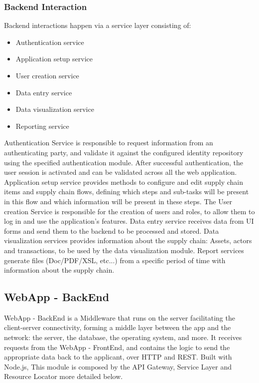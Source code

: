 \subsubsection{Backend Interaction}\label{sec:BackendInteraction}
Backend interactions happen via a service layer consisting of:

\begin{itemize}
\item Authentication service
\item Application setup service
\item User creation service
\item Data entry service
\item Data visualization service
\item Reporting service
\end{itemize}

Authentication Service is responsible to request information from an authenticating party, and validate it against the configured identity repository using the specified authentication module. After successful authentication, the user session is activated and can be validated across all the web application. Application setup service provides methods to configure and edit  supply chain items and supply chain flows, defining which steps and sub-tasks will be present in this flow and which information will be present in these steps. The User creation Service is responsible for the creation of users and roles, to allow them to log in and use the application’s features. Data entry service receives data from UI forms and send them to the backend to be processed and stored. Data visualization services provides information about the supply chain: Assets, actors and transactions, to be used by the data visualization module. Report services generate files (Doc/PDF/XSL, etc...) from a specific period of time with information about the supply chain.

\subsection{WebApp - BackEnd}\label{sec:WebAppBackEnd}
WebApp - BackEnd is a Middleware that runs on the server facilitating the client-server connectivity, forming a middle layer between the app and the network: the server, the database, the operating system, and more. It receives requests from the WebApp - FrontEnd, and contains the logic to send the appropriate data back to the applicant, over HTTP and REST. Built with Node.js, This module  is composed by the API Gateway, Service Layer and Resource Locator more detailed below.

